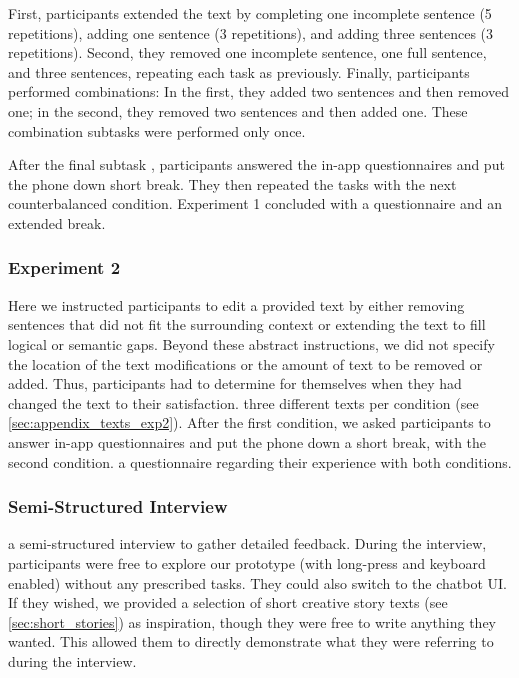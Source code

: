 First, participants extended the text by completing one incomplete sentence (5 repetitions), adding one sentence (3 repetitions), and adding three sentences (3 repetitions).
Second, they removed one incomplete sentence, one full sentence, and three sentences, repeating each task as previously.
Finally, participants performed combinations: 
In the first, they added two sentences and then removed one; 
in the second, they removed two sentences and then added one. 
These combination subtasks were performed only once.

After the final subtask , participants answered the in-app questionnaires and put the phone down  short break.
They then repeated the tasks with the next counterbalanced condition. 
 Experiment 1 concluded with a questionnaire and an extended break. %




\subsubsection{Experiment 2} %
\label{sec:procedure_exp2}
Here we instructed participants to edit a provided text by either removing sentences that did not fit the surrounding context or extending the text to fill logical or semantic gaps.
Beyond these abstract instructions, we did not specify the location of the text modifications or the amount of text to be removed or added. 
Thus, participants had to determine for themselves when they had changed the text to their satisfaction.
 three different texts per condition (see \cref{sec:appendix_texts_exp2}).
After the first condition, we asked participants to answer in-app questionnaires and put the phone down  a short break,  with the second condition.
 a questionnaire regarding their experience with both conditions.

\subsubsection{Semi-Structured Interview}
 a semi-structured interview to gather detailed feedback. 
During the interview, participants were free to explore our prototype (with long-press and keyboard enabled) without any prescribed tasks.
They could also switch to the chatbot UI.
If they wished, we provided a selection of short creative story texts (see \cref{sec:short_stories}) as inspiration, though they were free to write anything they wanted.
This allowed them to directly demonstrate what they were referring to during the interview. %
